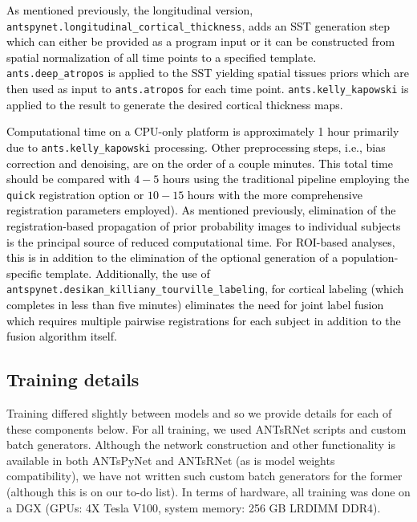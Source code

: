 \documentclass[
  12pt,
]{article}
\begin{document}
\textcolor{black}{As mentioned previously, the longitudinal version,}
\texttt{antspynet.longitudinal\_cortical\_thickness},
\textcolor{black}{adds an SST
generation step which can either be provided as a program input or it can be
constructed from spatial normalization of all time points to a specified
template.} \texttt{ants.deep\_atropos}
\textcolor{black}{is applied to the SST
yielding spatial tissues priors which are then used as input to}
\texttt{ants.atropos} \textcolor{black}{for each time point. }
\texttt{ants.kelly\_kapowski}
\textcolor{black}{is applied to the result to generate the desired cortical
thickness maps.}

\textcolor{black}{Computational time on a CPU-only platform is approximately 1
hour primarily due to} \texttt{ants.kelly\_kapowski}
\textcolor{black}{processing.
Other preprocessing steps, i.e., bias correction and denoising, are on the order of a
couple minutes. This total time should be compared with $4-5$ hours
using the traditional pipeline employing the} \texttt{quick}
\textcolor{black}{registration option or $10-15$ hours with the more
comprehensive registration parameters employed).  As mentioned previously,
elimination of the registration-based propagation of prior probability images to
individual subjects is the principal source of reduced computational time. For
ROI-based analyses, this is in addition to the elimination of the optional
generation of a population-specific template. Additionally, the use of}
\texttt{antspynet.desikan\_killiany\_tourville\_labeling},
\textcolor{black}{for cortical
labeling (which completes in less than five minutes) eliminates the need for
joint label fusion which requires multiple pairwise registrations for each
subject in addition to the fusion algorithm itself.}

\hypertarget{training-details}{%
\subsection*{Training details}\label{training-details}}

Training differed slightly between models and so we provide details for
each of these components below. For all training, we used ANTsRNet
scripts and custom batch generators. Although the network construction
and other functionality is available in both ANTsPyNet and ANTsRNet (as
is model weights compatibility), we have not written such custom batch
generators for the former (although this is on our to-do list). In terms
of hardware, all training was done on a DGX (GPUs: 4X Tesla V100, system
memory: 256 GB LRDIMM DDR4).
\end{document}
